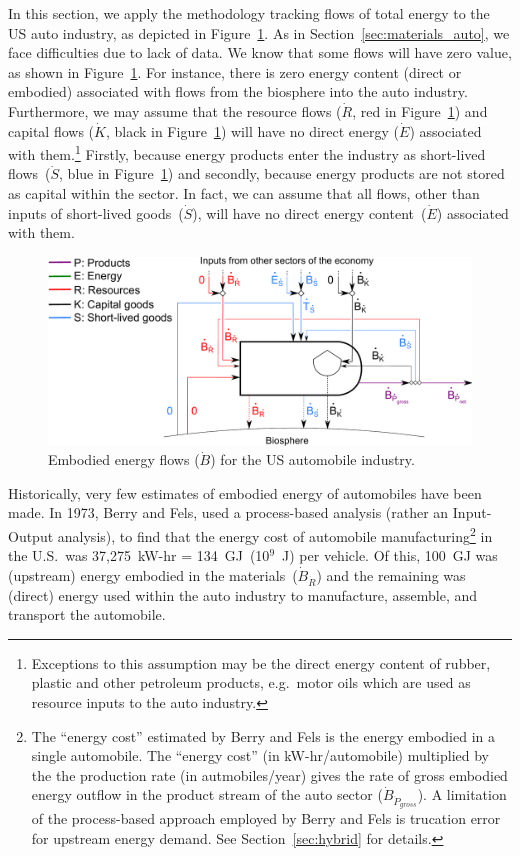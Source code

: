In this section,
we apply the methodology tracking flows of
total energy to the US auto industry,
as depicted in Figure~\ref{fig:PERKS_embodied_auto}.
As in Section~\ref{sec:materials_auto},
we face difficulties due to lack of data.
We know that some flows will have zero value,
as shown in Figure~\ref{fig:PERKS_embodied_auto}.
For instance, there is zero energy content
(direct or embodied) associated with
flows from the biosphere into the auto industry.
Furthermore,
we may assume that the
resource flows ($\dot{R}$, red in Figure~\ref{fig:PERKS_embodied_auto})
and capital flows ($\dot{K}$, black in Figure~\ref{fig:PERKS_embodied_auto}) 
will have no direct energy ($\dot{E}$)
associated with them.\footnote{Exceptions
to this assumption may be the direct energy content
of rubber, plastic and other petroleum products,
e.g.\ motor oils which are used as resource
inputs to the auto industry.}
Firstly,
because energy products enter the industry 
as short-lived flows~($\dot{S}$, blue in Figure~\ref{fig:PERKS_embodied_auto}) 
and secondly,
because energy products are not stored
as capital within the sector.
In fact,
we can assume that all flows,
other than inputs of short-lived
goods~($\dot{S}$),
will have no direct energy content~($\dot{E}$) 
associated with them.

\begin{figure}[!ht]
\centering
\includegraphics[width=0.8\linewidth]{Part_1/Chapter_Embodied/images/PERKS_basic_unit_embodied_energy_content_auto_ind.pdf}
\caption[Embodied energy flows for the US automobile industry]{Embodied energy flows ($\dot{B}$) for the US automobile industry.}
\label{fig:PERKS_embodied_auto}
\end{figure}

Historically, very few estimates of embodied energy of automobiles have been made.
In 1973, Berry and Fels, used a process-based analysis 
(rather an Input-Output analysis),
to find that the energy cost of automobile 
manufacturing\footnote{The ``energy cost'' estimated 
by Berry and Fels is the 
energy embodied in a single automobile. 
The ``energy cost'' (in kW-hr/automobile) multiplied by the 
the production rate (in autmobiles/year) gives the rate of gross embodied
energy outflow in the product stream of the auto sector ($\dot{B}_{\dot{P}_{gross}}$).
A limitation of the process-based approach employed by Berry and Fels
is trucation error for upstream energy demand. 
See Section~\ref{sec:hybrid} for details.
}
in the U.S.\ was 37,275~kW-hr = 134~GJ~(10$^9$~J) 
per vehicle.\cite[Table~2]{Berry:1973vo} 
Of this,
100~GJ was (upstream) energy embodied in the materials~($\dot{B}_{\dot{R}}$)
and the remaining was (direct) energy used within the auto
industry to manufacture,
assemble, and transport the automobile. 

